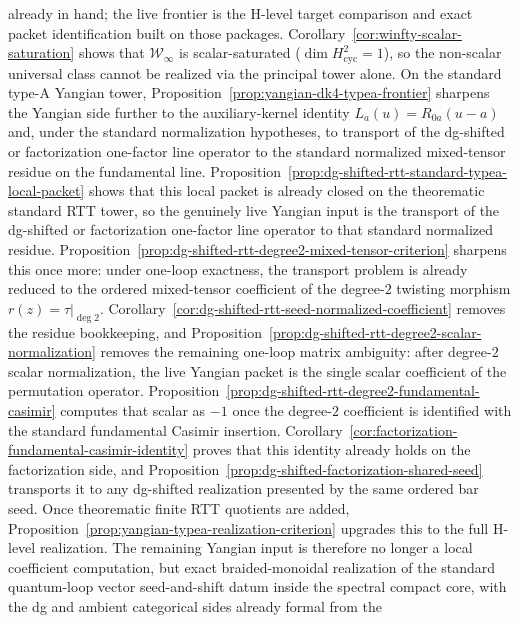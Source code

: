 \begin{remark}
\begin{itemize}
  already in hand; the live frontier is the H-level target comparison
  and exact packet identification built on those packages.
  Corollary~\ref{cor:winfty-scalar-saturation} shows that
  $\mathcal{W}_\infty$ is scalar-saturated
  ($\dim H^2_{\mathrm{cyc}} = 1$), so the non-scalar universal
  class cannot be realized via the principal tower alone.
  On the
  standard type-A Yangian tower, Proposition~\ref{prop:yangian-dk4-typea-frontier}
  sharpens the Yangian side further to the auxiliary-kernel identity
  $L_a(u)=R_{0a}(u-a)$ and, under the standard normalization
  hypotheses, to transport of the dg-shifted or factorization
  one-factor line operator to the standard normalized mixed-tensor
  residue on the fundamental line.  Proposition~\ref{prop:dg-shifted-rtt-standard-typea-local-packet}
  shows that this local packet is already closed on the theorematic
  standard RTT tower, so the genuinely live Yangian input is the
  transport of the dg-shifted or factorization one-factor line
  operator to that standard normalized residue.
  Proposition~\ref{prop:dg-shifted-rtt-degree2-mixed-tensor-criterion}
  sharpens this once more: under one-loop exactness, the transport
  problem is already reduced to the ordered mixed-tensor coefficient of
  the degree-$2$ twisting morphism $r(z)=\tau|_{\deg 2}$.
  Corollary~\ref{cor:dg-shifted-rtt-seed-normalized-coefficient}
  removes the residue bookkeeping, and
  Proposition~\ref{prop:dg-shifted-rtt-degree2-scalar-normalization}
  removes the remaining one-loop matrix ambiguity: after
  degree-$2$ scalar normalization, the live Yangian packet is the
  single scalar coefficient of the permutation operator.
  Proposition~\ref{prop:dg-shifted-rtt-degree2-fundamental-casimir}
  computes that scalar as $-1$ once the degree-$2$ coefficient is
  identified with the standard fundamental Casimir insertion.
  Corollary~\ref{cor:factorization-fundamental-casimir-identity}
  proves that this identity already holds on the factorization side, and
  Proposition~\ref{prop:dg-shifted-factorization-shared-seed}
  transports it to any dg-shifted realization presented by the same
  ordered bar seed.  Once theorematic finite RTT quotients are added,
  Proposition~\ref{prop:yangian-typea-realization-criterion} upgrades
  this to the full H-level realization.  The remaining Yangian input is
  therefore no longer a local coefficient computation, but exact
  braided-monoidal realization of the standard quantum-loop vector
  seed-and-shift datum inside the spectral compact core,
  with the dg and ambient categorical sides already formal from the

\end{itemize}
\end{remark}
